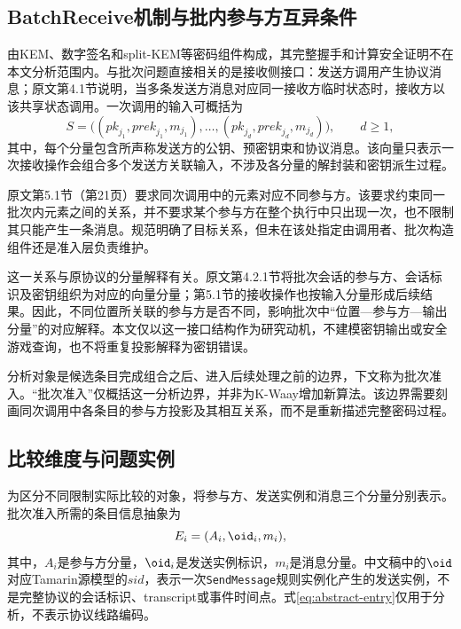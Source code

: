 \subsection{BatchReceive机制与批内参与方互异条件}
\label{subsec:batchreceive-condition}

\kwaay 由KEM、数字签名和split-KEM等密码组件构成，其完整握手和计算安全证明不在本文分析范围内\cite{collins2024kwaay}。与批次问题直接相关的是接收侧接口：发送方调用\sendaction 产生协议消息；原文第4.1节说明，当多条发送方消息对应同一接收方临时状态时，接收方以该共享状态调用\batchreceive\cite{collins2024kwaayfull}。一次调用的输入可概括为
\[
  S=\bigl((\mathit{pk}_{j_1},\mathit{prek}_{j_1},m_{j_1}),\ldots,
           (\mathit{pk}_{j_d},\mathit{prek}_{j_d},m_{j_d})\bigr),
  \qquad d\geq 1,
\]
其中，每个分量包含所声称发送方的公钥、预密钥束和协议消息。该向量只表示一次接收操作会组合多个发送方关联输入，不涉及各分量的解封装和密钥派生过程。

原文第5.1节（第21页）要求同次\batchreceive 调用中的元素对应不同参与方\cite{collins2024kwaayfull}。该要求约束同一批次内元素之间的关系，并不要求某个参与方在整个执行中只出现一次，也不限制其只能产生一条消息。规范明确了目标关系，但未在该处指定由调用者、批次构造组件还是准入层负责维护。

这一关系与原协议的分量解释有关。原文第4.2.1节将批次会话的参与方、会话标识及密钥组织为对应的向量分量；第5.1节的接收操作也按输入分量形成后续结果\cite{collins2024kwaayfull}。因此，不同位置所关联的参与方是否不同，影响批次中“位置—参与方—输出分量”的对应解释。本文仅以这一接口结构作为研究动机，不建模密钥输出或安全游戏查询，也不将重复投影解释为密钥错误。

分析对象是候选条目完成组合之后、进入后续处理之前的边界，下文称为批次准入。“批次准入”仅概括这一分析边界，并非为K-Waay增加新算法。该边界需要刻画同次调用中各条目的参与方投影及其相互关系，而不是重新描述完整密码过程。

\subsection{比较维度与问题实例}
\label{subsec:identity-coordinates}

为区分不同限制实际比较的对象，将参与方、发送实例和消息三个分量分别表示。批次准入所需的条目信息抽象为
\begin{equation}
  E_i=(A_i,\oid_i,m_i),
  \label{eq:abstract-entry}
\end{equation}
其中，$A_i$是参与方分量，$\oid_i$是发送实例标识，$m_i$是消息分量。中文稿中的$\oid$对应Tamarin源模型的$\mathit{sid}$，表示一次\texttt{SendMessage}规则实例化产生的发送实例，不是完整协议的会话标识、transcript或事件时间点。式\eqref{eq:abstract-entry}仅用于分析，不表示协议线路编码。

